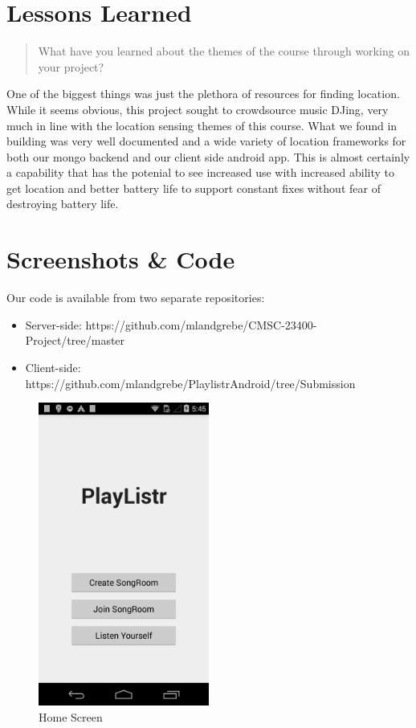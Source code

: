 \documentclass[12pt]{article}
\begin{document}
\pagebreak

\section{Lessons Learned}
\begin{quote}
  What have you learned about the themes of the course through working
  on your project?
\end{quote}

One of the biggest things was just the plethora of resources for
finding location. While it seems obvious, this project sought to
crowdsource music DJing, very much in line with the location sensing
themes of this course. What we found in building was very well
documented and a wide variety of location frameworks for both our
mongo backend and our client side android app. This is almost
certainly a capability that has the potenial to see increased use with
increased ability to get location and better battery life to support
constant fixes without fear of destroying battery life.

\pagebreak

\section{Screenshots \& Code }

Our code is available from two separate repositories:
\begin{itemize}
\item Server-side:
  https://github.com/mlandgrebe/CMSC-23400-Project/tree/master
\item Client-side: https://github.com/mlandgrebe/PlaylistrAndroid/tree/Submission
\end{itemize}

\begin{figure}[h]
  \centering
    \includegraphics[width=0.5\textwidth]{frontpage}
    \caption{Home Screen}
\end{figure}
\end{document}
